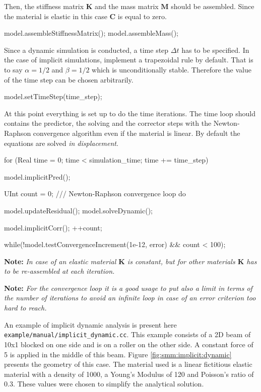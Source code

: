\documentclass[a4paper,11pt]{book}
\newcommand{\akantu}{{\cminfamily{\textbf{Akantu}}}\xspace}
\newcommand{\code}[1]{\texttt{#1}}
\newcommand{\note}[1]{\textbf{Note: }\textit{#1}}
\newcommand{\mat}[1]{\ensuremath{\boldsymbol{#1}}}
\begin{document}
Then, the  stiffness matrix  $\mat{K}$ and the  mass matrix $\mat{M}$  should be
assembled.  Since  the material is  elastic in this  case $\mat{C}$ is  equal to
zero.
\begin{cpp}
  model.assembleStiffnessMatrix();
  model.assembleMass();
\end{cpp}

Since  a dynamic  simulation is  conducted, a  time step  $\Delta t$  has  to be
specified. In the case of  implicit simulations, \akantu implement a trapezoidal
rule by  default.  That  is to say  $\alpha =  1/2$ and $\beta  = 1/2$  which is
unconditionally  stable. Therefore  the value  of the  time step  can  be chosen
arbitrarily.  
\begin{cpp}
  model.setTimeStep(time_step);
\end{cpp}

At this  point everything is  set up  to do the  time iterations. The  time loop
should  contains the predictor,  the solving  and the  corrector steps  with the
Newton-Raphson convergence algorithm even if the material is linear.  By default
the        equations       are       solved        \emph{in       displacement}.
\begin{cpp}
  for (Real time = 0; time < simulation_time; time += time_step) {
    model.implicitPred();

    UInt count = 0;
    /// Newton-Raphson convergence loop
    do {
      model.updateResidual();
      model.solveDynamic();

      model.implicitCorr();
      ++count;
    } while(!model.testConvergenceIncrement(1e-12, error) && count < 100);
  }
\end{cpp}

\note{In  case of  an  elastic material  $\mat{K}$  is constant,  but for  other
  materials $\mat{K}$ has to be re-assembled at each iteration.}

\note{For the convergence loop  it is a good usage to put  also a limit in terms
  of the  number of iterations  to avoid  an infinite loop  in case of  an error
  criterion too hard to reach.}

An    example    of    implicit     dynamic    analysis    is    present    here
\code{example/manual/implicit\_dynamic.cc}.  This example  consists of a 2D beam
of \unit{10}{\meter}x\unit{1}{\meter} blocked on one  side and is on a roller on
the other  side.  A constant force  of \unit{5}{\kilo\newton} is  applied in the
middle  of  this   beam.   Figure  \ref{fig:smm:implicit:dynamic}  presents  the
geometry of this case. The material used is a linear fictitious elastic material
with  a density  of  \unit{1000}{\kilogrampercubicmetre}, a  Young's Modulus  of
\unit{120}{\mega\pascal} and Poisson's ratio  of $0.3$. These values were chosen
to simplify the analytical solution.
\end{document}
